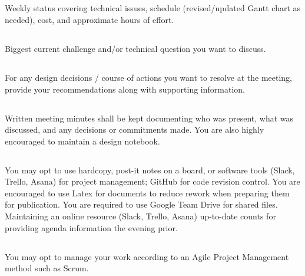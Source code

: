 \documentclass[10pt,courier]{navymemo}
\begin{document}
\subsection{} Weekly status covering technical issues, schedule (revised/updated Gantt chart as needed), cost, and approximate hours of effort. 
\subsection{} Biggest current challenge and/or technical question you want to discuss.
\subsection{} For any design decisions / course of actions you want to resolve at the meeting, provide your recommendations along with supporting information.
\subsection{} Written meeting minutes shall be kept documenting who was present, what was discussed, and any decisions or commitments made.  You are also highly encouraged to maintain a design notebook. 
\subsection{} You may opt to use hardcopy, post-it notes on a board, or software tools (Slack, Trello, Asana) for project management; GitHub for code revision control. You are encouraged to use Latex for documents to reduce rework when preparing them for publication. You are required to use Google Team Drive for shared files. Maintaining an online resource (Slack, Trello, Asana) up-to-date counts for providing agenda information the evening prior. 
\subsection{} You may opt to manage your work according to an Agile Project Management method such as Scrum. 
\end{document}
